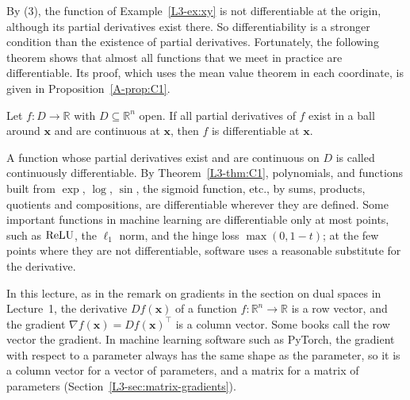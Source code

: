 By (3), the function of Example~\ref{L3-ex:xy} is not differentiable at the origin, although its partial derivatives exist there. So differentiability is a stronger condition than the existence of partial derivatives. Fortunately, the following theorem shows that almost all functions that we meet in practice are differentiable. Its proof, which uses the mean value theorem in each coordinate, is given in Proposition~\ref{A-prop:C1}.

\begin{theorem}\label{L3-thm:C1}
    Let $f: D \to \mathbb{R}$ with $D \subseteq \mathbb{R}^n$ open. If all partial derivatives of $f$ exist in a ball around $\mathbf{x}$ and are continuous at $\mathbf{x}$, then $f$ is differentiable at $\mathbf{x}$.
\end{theorem}

A function whose partial derivatives exist and are continuous on $D$ is called continuously differentiable. By Theorem~\ref{L3-thm:C1}, polynomials, and functions built from $\exp$, $\log$, $\sin$, the sigmoid function, etc., by sums, products, quotients and compositions, are differentiable wherever they are defined. Some important functions in machine learning are differentiable only at most points, such as $\operatorname{ReLU}$, the $\ell_1$ norm, and the hinge loss $\max(0, 1 - t)$; at the few points where they are not differentiable, software uses a reasonable substitute for the derivative.

\begin{remark}[Notation]
    In this lecture, as in the remark on gradients in the section on dual spaces in Lecture~1, the derivative $Df(\mathbf{x})$ of a function $f: \mathbb{R}^n \to \mathbb{R}$ is a row vector, and the gradient $\nabla f(\mathbf{x}) = Df(\mathbf{x})^\top$ is a column vector. Some books call the row vector the gradient. In machine learning software such as PyTorch, the gradient with respect to a parameter always has the same shape as the parameter, so it is a column vector for a vector of parameters, and a matrix for a matrix of parameters (Section~\ref{L3-sec:matrix-gradients}).
\end{remark}

